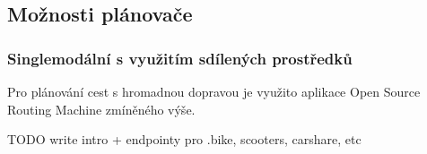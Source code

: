 \documentclass[thesis=M,czech]{FITthesis}[2019/12/23]
\theoremstyle{plain}
\theoremstyle{definition}
\begin{document}







\subsection{Možnosti plánovače}

\subsubsection{Singlemodální s využitím sdílených prostředků}

Pro plánování cest s hromadnou dopravou je využito aplikace Open Source Routing Machine zmíněného výše.

TODO write intro + endpointy pro .bike, scooters, carshare, etc
\end{document}
